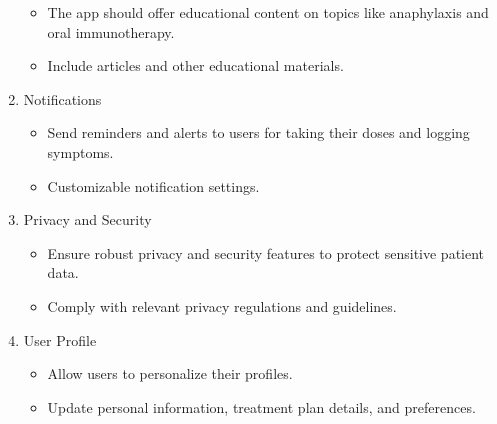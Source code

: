 \begin{enumerate}
        \begin{itemize}
            \item The app should offer educational content on topics like anaphylaxis and oral immunotherapy.
            \item Include articles and other educational materials.
        \end{itemize}
        \item Notifications
        \begin{itemize}
            \item Send reminders and alerts to users for taking their doses and logging symptoms.
            \item Customizable notification settings.
        \end{itemize}
        \item Privacy and Security
        \begin{itemize}
            \item Ensure robust privacy and security features to protect sensitive patient data.
            \item Comply with relevant privacy regulations and guidelines.
        \end{itemize}
        \item User Profile 
        \begin{itemize}
            \item Allow users to personalize their profiles.
            \item Update personal information, treatment plan details, and preferences.
        \end{itemize}
    \end{enumerate}

